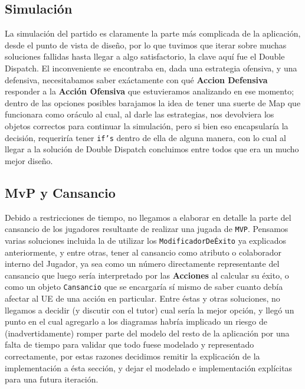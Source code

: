 \subsection{Simulación}

La simulación del partido es claramente la parte más complicada de la aplicación, desde el punto de vista de diseño, por lo que tuvimos que iterar sobre muchas soluciones fallidas hasta llegar a algo satisfactorio, la clave aquí fue el Double Dispatch. El inconveniente se encontraba en, dada una estrategia ofensiva, y una defensiva, necesitabamos saber exáctamente con qué \textbf{Accion Defensiva} responder a la \textbf{Acción Ofensiva} que estuvieramos analizando en ese momento; dentro de las opciones posibles barajamos la idea de tener una suerte de Map que funcionara como oráculo al cual, al darle las estrategias, nos devolviera los objetos correctos para continuar la simulación, pero si bien eso encapsularía la decisión, requeriría tener \texttt{if's} dentro de ella de alguna manera, con lo cual al llegar a la solución de Double Dispatch concluimos entre todos que era un mucho mejor diseño.

\subsection{MvP y Cansancio}

Debido a restricciones de tiempo, no llegamos a elaborar en detalle la parte del cansancio de los jugadores resultante de realizar una jugada de \texttt{MVP}. Pensamos varias soluciones incluida la de utilizar los \texttt{ModificadorDeÉxito} ya explicados anteriormente, y entre otras, tener al cansancio como atributo o colaborador interno del Jugador, ya sea como un número directamente representante del cansancio que luego sería interpretado por las \textbf{Acciones} al calcular su éxito, o como un objeto \texttt{Cansancio} que se encargaría sí mismo de saber cuanto debía afectar al UE de una acción en particular. Entre éstas y otras soluciones, no llegamos a decidir (y discutir con el tutor) cual sería la mejor opción, y llegó un punto en el cual agregarlo a los diagramas habría implicado un riesgo de (inadvertidamente) romper parte del modelo del resto de la aplicación por una falta de tiempo para validar que todo fuese modelado y representado correctamente, por estas razones decidimos remitir la explicación de la implementación a ésta sección, y dejar el modelado e implementación explícitas para una futura iteración.

